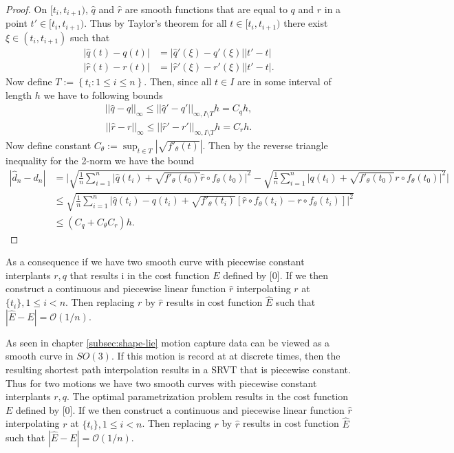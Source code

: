 \begin{proof}
  On  \([t_i, t_{i+1})\),  \(\hat q\) and  \(\hat r\) are smooth functions that are equal to  \(q\) and  \(r\) in a point  \(t' \in [t_i, t_{i+1})\). Thus by Taylor's theorem for all  \(t \in [t_i, t_{i+1})\) there exist  \(\xi \in (t_i, t_{i+1})\) such that
  \begin{eqnarray}
    |\hat q(t) - q(t)|  &= |\hat q'(\xi) - q'(\xi)||t' - t| \\
    |\hat r(t) - r(t)|  &= |\hat r'(\xi) - r'(\xi)||t' - t|.
  \end{eqnarray}
  Now define  \(T:= \left \{t_i : 1 \leq i \leq n \right \} \). Then, since all  \(t \in I\) are in some interval of length  \(h\) we have to following bounds
  \begin{eqnarray}
    ||\hat q - q||_{\infty} \leq ||\hat q' - q'||_{\infty, I \setminus T}h = C_q h,
  \end{eqnarray}
  \begin{eqnarray}
    ||\hat r - r||_{\infty} \leq ||\hat r' - r'||_{\infty, I \setminus T}h = C_r h.
  \end{eqnarray}
  Now define constant  \(C_{\theta}:= \sup_{t\in T} | \sqrt{f'_\theta(t)} | \). Then by the reverse triangle inequality for the 2-norm we have the bound
  \begin{align}
    |\hat d_n - d_n | 
      & = \Bigg| \sqrt{\frac{1}{n}\sum_{i=1}^{n}\Big|\hat q(t_i) + \sqrt{f'_{\theta}(t_0)} \hat r \circ f_{\theta}(t_0)\Big|^2}-\sqrt{\frac{1}{n}\sum_{i=1}^{n}\Big|q(t_i) + \sqrt{f'_{\theta}(t_0)} r \circ f_{\theta}(t_0)\Big|^2 } \Bigg|\\
     & \leq \sqrt{\frac{1}{n}\sum_{i=1}^{n}\Big|\hat q(t_i) - q(t_i)  + \sqrt{f'_{\theta}(t_i)}\left[  \hat r \circ f_{\theta}(t_i) - r \circ f_{\theta}(t_i)\right]\Big|^2}\\
     & \leq \left(C_q  + C_{\theta} C_r \right)h.
  \end{align}
\end{proof}

As a consequence if we have two smooth curve with piecewise constant interplants \(r, q\) that results i in the cost function \(E\) defined by [0]. If we then construct a continuous and piecewise linear function \(\hat r\) interpolating \(r\) at \(\{t_i\}, 1 \leq i <n\). Then replacing \(r\) by \(\hat r\) results in cost function  \(\hat{E}\) such that \(|\hat{E} - E |= \mathcal{O}(1/n)\). 

As seen in chapter \ref{subsec:shape-lie} motion capture data can be viewed as a smooth curve in \(SO(3)\). If this motion is record at at discrete times, then the resulting shortest path interpolation results in a SRVT that is piecewise constant. Thus for two motions we have two smooth curves with piecewise constant interplants \(r, q\). The optimal parametrization problem results in the cost function \(E\) defined by [0]. If we then construct a continuous and piecewise linear function \(\hat r\) interpolating \(r\) at \(\{t_i\}, 1 \leq i <n\). Then replacing \(r\) by \(\hat r\) results in cost function  \(\hat{E}\) such that \(|\hat{E} - E |= \mathcal{O}(1/n)\). 